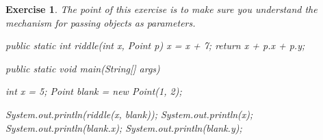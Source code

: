 \documentclass[12pt]{book}
\theoremstyle{exercise}
\newtheorem{exercise}{Exercise}[chapter]
\newcommand{\java}{\verb}%}
\begin{document}
\begin{exercise}
The point of this exercise is to make sure you understand the mechanism for passing objects as parameters.


\begin{code}
public static int riddle(int x, Point p) {
    x = x + 7;
    return x + p.x + p.y;
}
\end{code}

\begin{code}
public static void main(String[] args) {
    int x = 5;
    Point blank = new Point(1, 2);

    System.out.println(riddle(x, blank));
    System.out.println(x);
    System.out.println(blank.x);
    System.out.println(blank.y);
}
\end{code}

\end{exercise}
\end{document}
